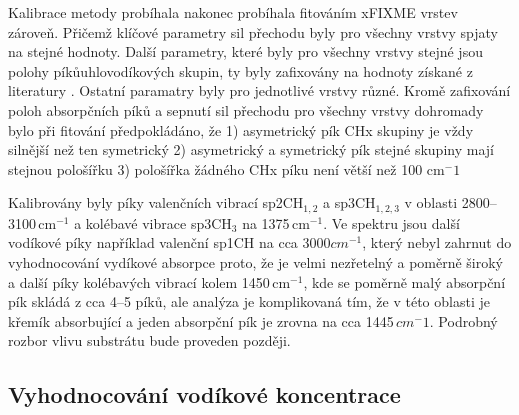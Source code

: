 Kalibrace metody probíhala nakonec probíhala fitováním xFIXME vrstev zároveň. Přičemž klíčové parametry sil přechodu byly pro všechny vrstvy spjaty na stejné hodnoty. Další parametry, které byly pro všechny vrstvy stejné jsou polohy píkůuhlovodíkových skupin, ty byly zafixovány na hodnoty získané z literatury \cite{Robertson2002, Dischler1983, Ristein1998, Zajickova2011}. Ostatní paramatry byly pro jednotlivé vrstvy různé.
Kromě zafixování poloh absorpčních píků a sepnutí sil přechodu pro všechny vrstvy dohromady bylo při fitování předpokládáno, že 
1) asymetrický pík CHx skupiny je vždy silnější než ten symetrický
2) asymetrický a symetrický pík stejné skupiny mají stejnou pološířku
3) pološířka žádného CHx píku není větší než 100 cm$^-1$

Kalibrovány byly píky valenčních vibrací sp2CH$_{1,2}$ a sp3CH$_{1,2,3}$ v oblasti 2800--3100\,cm$^{-1}$ a kolébavé vibrace sp3CH$_3$ na 1375\,cm$^{-1}$. Ve spektru jsou další vodíkové píky například valenční sp1CH na cca 3000$cm^{-1}$, který nebyl zahrnut do vyhodnocování vydíkové absorpce proto, že je velmi nezřetelný a poměrně široký a další píky kolébavých vibrací kolem 1450\,cm$^{-1}$, kde se poměrně malý absorpční pík skládá z cca 4--5 píků, ale analýza je komplikovaná tím, že v této oblasti je křemík absorbující a jeden absorpční pík je zrovna na cca 1445\,$cm^-1$. Podrobný rozbor vlivu substrátu bude proveden později.

\subsection{Vyhodnocování vodíkové koncentrace}

\cleardoublepage
